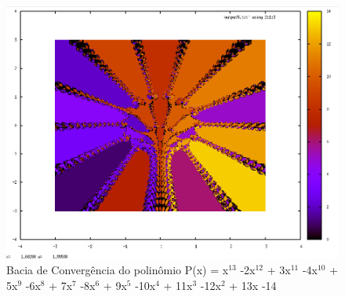 \documentclass[11pt]{article}
\begin{document}
\begin{figure}[h!]
  \begin{center}
    \includegraphics[scale=0.5]{7}
    \caption{Bacia de Convergência do polinômio P(x) = x$^{13}$ -2x$^{12}$ + 3x$^{11}$ -4x$^{10}$ + 5x$^9$ -6x$^8$ + 7x$^7$ -8x$^6$ + 9x$^5$ -10x$^4$ + 11x$^3$ -12x$^2$ + 13x -14}
  \end{center}
\end{figure}
\end{document}
